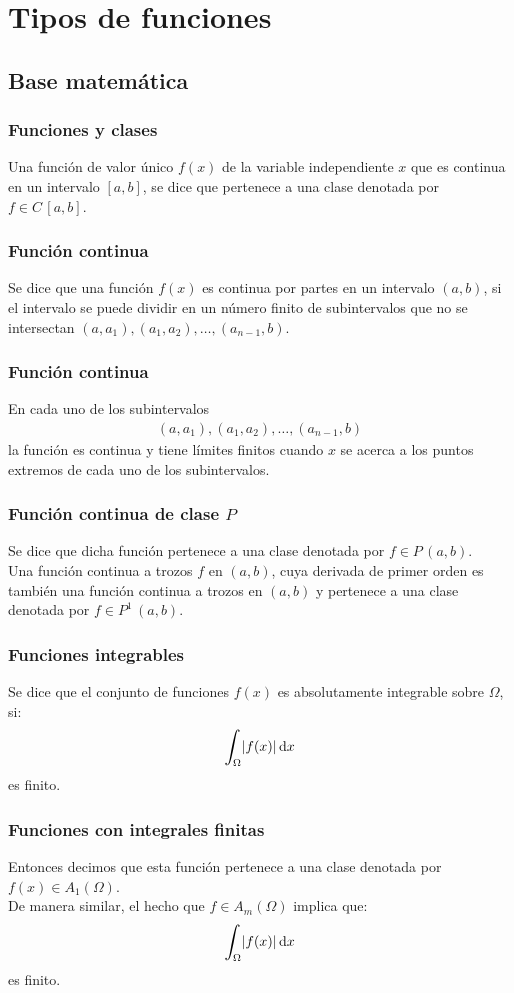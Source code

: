 \documentclass[12pt]{beamer}
\begin{document}
\section{Tipos de funciones}
\subsection{Base matemática}

\begin{frame}
\frametitle{Funciones y clases}
Una función de valor único $f (x)$ de la variable independiente $x$ que es continua en un intervalo $[a, b]$, se dice que pertenece a una clase denotada por $f \in C \, [a, b]$.
\end{frame}
\begin{frame}
\frametitle{Función continua}
Se dice que una función $f (x)$ es continua por partes en un intervalo $(a, b)$, \pause si el intervalo se puede dividir en un número finito de subintervalos que no se intersectan $(a, a_{1}), (a_{1}, a_{2}), \ldots, (a_{n -1}, b)$.
\end{frame}
\begin{frame}
\frametitle{Función continua}
En cada uno de los subintervalos
\begin{align*}
(a, a_{1}), (a_{1}, a_{2}), \ldots, (a_{n -1}, b)
\end{align*}
la función es continua y tiene límites finitos cuando $x$ se acerca a los puntos extremos de cada uno de los subintervalos.
\end{frame}
\begin{frame}
\frametitle{Función continua de clase $P$}
Se dice que dicha función pertenece a una clase denotada por $f \in P \, (a, b)$.
\\
\bigskip
\pause
Una función continua a trozos $f$ en $(a, b)$, cuya derivada de primer orden es también una función continua a trozos en $(a, b)$ y pertenece a una clase denotada por $f \in P^{1} \, (a, b)$.
\end{frame}
\begin{frame}
\frametitle{Funciones integrables}
Se dice que el conjunto de funciones $f (x)$ es absolutamente integrable sobre $\Omega$, si:
\pause
\begin{align*}
\scaleint{6ex}_{\bs \Omega}  \abs{f (x)} \dd{x}
\end{align*}
es finito.
\end{frame}
\begin{frame}
\frametitle{Funciones con integrales finitas}
Entonces decimos que esta función pertenece a una clase denotada por $f (x) \in A_{1} (\Omega)$.
\\
\bigskip
\pause
De manera similar, el hecho que $f \in A_{m} (\Omega)$ implica que:
\begin{align*}
\scaleint{6ex}_{\bs \Omega}  \abs{f (x)} \dd{x}
\end{align*}
es finito.
\end{frame}
\end{document}
